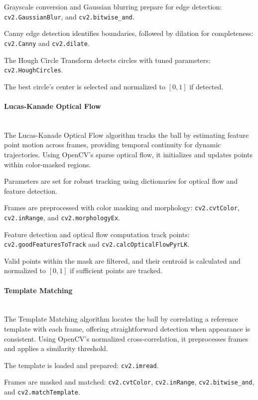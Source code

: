 \documentclass[12pt,a4paper]{article}
\begin{document}
Grayscale conversion and Gaussian blurring prepare for edge detection: \texttt{cv2.GaussianBlur}, and \texttt{cv2.bitwise\_and}.

Canny edge detection identifies boundaries, followed by dilation for completeness: \texttt{cv2.Canny} and \texttt{cv2.dilate}.

The Hough Circle Transform detects circles with tuned parameters: \texttt{cv2.HoughCircles}.

The best circle's center is selected and normalized to $[0,1]$ if detected.

\paragraph{Lucas-Kanade Optical Flow}
\mbox{}\\

The Lucas-Kanade Optical Flow algorithm tracks the ball by estimating feature point motion across frames, providing temporal continuity for dynamic trajectories. Using OpenCV's sparse optical flow, it initializes and updates points within color-masked regions.

Parameters are set for robust tracking using dictionaries for optical flow and feature detection.

Frames are preprocessed with color masking and morphology: \texttt{cv2.cvtColor}, \texttt{cv2.inRange}, and \texttt{cv2.morphologyEx}.

Feature detection and optical flow computation track points: \texttt{cv2.goodFeaturesToTrack} and \texttt{cv2.calcOpticalFlowPyrLK}.

Valid points within the mask are filtered, and their centroid is calculated and normalized to $[0,1]$ if sufficient points are tracked.

\paragraph{Template Matching}
\mbox{}\\

The Template Matching algorithm locates the ball by correlating a reference template with each frame, offering straightforward detection when appearance is consistent. Using OpenCV's normalized cross-correlation, it preprocesses frames and applies a similarity threshold.

The template is loaded and prepared: \texttt{cv2.imread}.

Frames are masked and matched: \texttt{cv2.cvtColor}, \texttt{cv2.inRange}, \texttt{cv2.bitwise\_and}, and \texttt{cv2.matchTemplate}.
\end{document}
